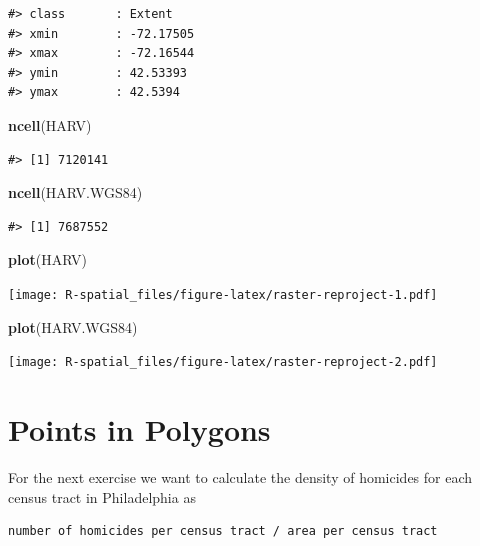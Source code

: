 \documentclass[]{book}
\newenvironment{Shaded}{\begin{snugshade}}{\end{snugshade}}
\newcommand{\KeywordTok}[1]{\textcolor[rgb]{0.13,0.29,0.53}{\textbf{#1}}}
\newcommand{\NormalTok}[1]{#1}
\theoremstyle{definition}
\theoremstyle{definition}
\theoremstyle{definition}
\theoremstyle{remark}
\begin{document}
\begin{verbatim}
#> class       : Extent 
#> xmin        : -72.17505 
#> xmax        : -72.16544 
#> ymin        : 42.53393 
#> ymax        : 42.5394
\end{verbatim}

\begin{Shaded}
\begin{Highlighting}[]
\KeywordTok{ncell}\NormalTok{(HARV)}
\end{Highlighting}
\end{Shaded}

\begin{verbatim}
#> [1] 7120141
\end{verbatim}

\begin{Shaded}
\begin{Highlighting}[]
\KeywordTok{ncell}\NormalTok{(HARV.WGS84)}
\end{Highlighting}
\end{Shaded}

\begin{verbatim}
#> [1] 7687552
\end{verbatim}

\begin{Shaded}
\begin{Highlighting}[]
\KeywordTok{plot}\NormalTok{(HARV)}
\end{Highlighting}
\end{Shaded}

\texttt{[image: R-spatial\_files/figure-latex/raster-reproject-1.pdf]}

\begin{Shaded}
\begin{Highlighting}[]
\KeywordTok{plot}\NormalTok{(HARV.WGS84)}
\end{Highlighting}
\end{Shaded}

\texttt{[image: R-spatial\_files/figure-latex/raster-reproject-2.pdf]}

\section{Points in Polygons}\label{points-in-polygons}

For the next exercise we want to calculate the density of homicides for
each census tract in Philadelphia as

\begin{verbatim}
number of homicides per census tract / area per census tract
\end{verbatim}
\end{document}
